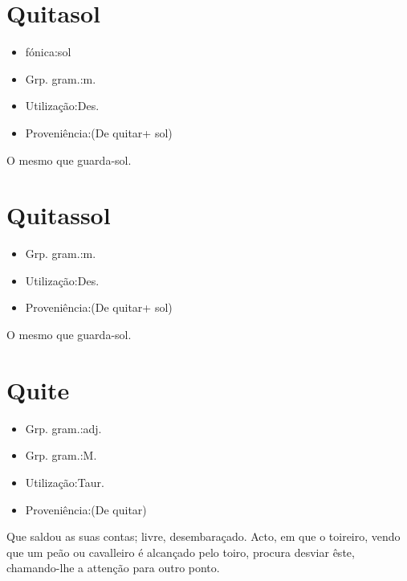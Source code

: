 \section{Quitasol}
\begin{itemize}
\item {fónica:sol}
\end{itemize}
\begin{itemize}
\item {Grp. gram.:m.}
\end{itemize}
\begin{itemize}
\item {Utilização:Des.}
\end{itemize}
\begin{itemize}
\item {Proveniência:(De \textunderscore quitar\textunderscore  + \textunderscore sol\textunderscore )}
\end{itemize}
O mesmo que \textunderscore guarda-sol\textunderscore .
\section{Quitassol}
\begin{itemize}
\item {Grp. gram.:m.}
\end{itemize}
\begin{itemize}
\item {Utilização:Des.}
\end{itemize}
\begin{itemize}
\item {Proveniência:(De \textunderscore quitar\textunderscore  + \textunderscore sol\textunderscore )}
\end{itemize}
O mesmo que \textunderscore guarda-sol\textunderscore .
\section{Quite}
\begin{itemize}
\item {Grp. gram.:adj.}
\end{itemize}
\begin{itemize}
\item {Grp. gram.:M.}
\end{itemize}
\begin{itemize}
\item {Utilização:Taur.}
\end{itemize}
\begin{itemize}
\item {Proveniência:(De \textunderscore quitar\textunderscore )}
\end{itemize}
Que saldou as suas contas; livre, desembaraçado.
Acto, em que o toireiro, vendo que um peão ou cavalleiro é alcançado pelo toiro, procura desviar êste, chamando-lhe a attenção para outro ponto.
